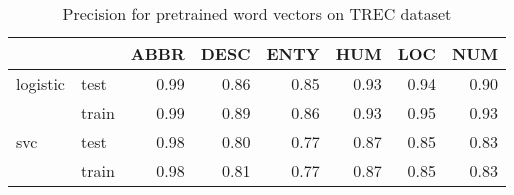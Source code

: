 \begin{table}[h]
\begin{center}

\begin{tabular}{llrrrrrr}
\toprule
 &&ABBR &DESC &ENTY &HUM &LOC &NUM \\
\midrule
logistic & test &0.99 &0.86 &0.85 & 0.93 & 0.94 & 0.90 \\
 & train &0.99 &0.89 &0.86 & 0.93 & 0.95 & 0.93 \\
svc & test &0.98 &0.80 &0.77 & 0.87 & 0.85 & 0.83 \\
 & train &0.98 &0.81 &0.77 & 0.87 & 0.85 & 0.83 \\
\bottomrule
\end{tabular}

\caption[Precision for pretrained word vectors on TREC dataset]{Precision for pretrained word vectors on TREC dataset}
\label{tab:}
\end{center}
\end{table}






